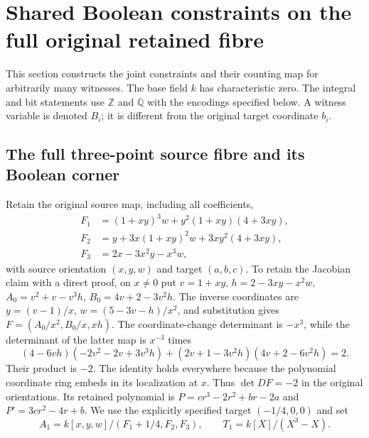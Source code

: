 \section{Shared Boolean constraints on the full original retained fibre}
\label{sec:sv-shared-verifier}

This section constructs the joint constraints and their counting map for
arbitrarily many witnesses. The base field $k$ has characteristic zero.
The integral and bit statements use $\mathbb Z$ and $\mathbb Q$ with the
encodings specified below. A witness variable is denoted $B_i$; it is
different from the original target coordinate $b_i$.

\subsection{The full three-point source fibre and its Boolean corner}

Retain the original source map, including all coefficients,
\begin{align*}
 F_1&=(1+xy)^3w+y^2(1+xy)(4+3xy),\\
 F_2&=y+3x(1+xy)^2w+3xy^2(4+3xy),\\
 F_3&=2x-3x^2y-x^3w,
\end{align*}
with source orientation $(x,y,w)$ and target $(a,b,c)$.
To retain the Jacobian claim with a direct proof, on $x\ne0$ put
$v=1+xy$, $h=2-3xy-x^2w$,
$A_0=v^2+v-v^3h$, $B_0=4v+2-3v^2h$.
The inverse coordinates are $y=(v-1)/x$, $w=(5-3v-h)/x^2$,
and substitution gives $F=(A_0/x^2,B_0/x,xh)$.
The coordinate-change determinant is $-x^3$, while the determinant
of the latter map is $x^{-3}$ times
\[
 (4-6vh)(-2v^2-2v+3v^3h)
 +(2v+1-3v^2h)(4v+2-6v^2h)=2.
\]
Their product is $-2$. The identity holds everywhere because the
polynomial coordinate ring embeds in its localization at $x$.
Thus $\det DF=-2$ in the original orientations. Its retained polynomial is
$P=cr^3-2r^2+br-2a$ and $P'=3cr^2-4r+b$.
We use the explicitly specified target $(-1/4,0,0)$ and set
\[
 A_1=k[x,y,w]/(F_1+1/4,F_2,F_3),\qquad
 T_1=k[X]/(X^3-X).
\]


